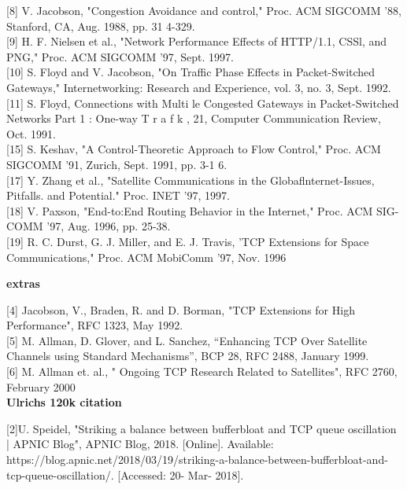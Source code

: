 \documentclass{uathesis}
\begin{document}
[8] V. Jacobson, "Congestion Avoidance and control," Proc. ACM SIGCOMM
'88, Stanford, CA, Aug. 1988, pp. 31 4-329. \\

[9] H. F. Nielsen et al., "Network Performance Effects of HTTP/1.1, CSSl, and
PNG," Proc. ACM SIGCOMM '97, Sept. 1997.\\

[10] S. Floyd and V. Jacobson, "On Traffic Phase Effects in Packet-Switched
Gateways," Internetworking: Research and Experience, vol. 3, no. 3, Sept.
1992.\\

[11] S. Floyd, Connections with Multi le Congested Gateways in Packet-Switched
Networks Part 1 : One-way T r a f k , 21, Computer Communication Review,
Oct. 1991. \\


[15] S. Keshav, "A Control-Theoretic Approach to Flow Control," Proc. ACM
SIGCOMM '91, Zurich, Sept. 1991, pp. 3-1 6. \\


[17] Y. Zhang et al., "Satellite Communications in the Globaflnternet-Issues,
Pitfalls. and Potential." Proc. INET '97, 1997.\\

[18] V. Paxson, "End-to:End Routing Behavior in the Internet," Proc. ACM SIG-
COMM '97, Aug. 1996, pp. 25-38.\\

[19] R. C. Durst, G. J. Miller, and E. J. Travis, 'TCP Extensions for Space Communications," Proc. ACM MobiComm '97, Nov. 1996

\textbf{extras}

[4] Jacobson, V., Braden, R. and D. Borman, "TCP Extensions for High Performance", RFC 1323, May 1992. \\

[5] M. Allman, D. Glover, and L. Sanchez, “Enhancing TCP Over Satellite Channels using Standard Mechanisms”, BCP 28, RFC 2488, January 1999.\\

 [6] M. Allman et. al., " Ongoing TCP Research Related to Satellites", RFC 2760, February 2000\\

\textbf{Ulrichs 120k citation}

[2]U. Speidel, "Striking a balance between bufferbloat and TCP queue oscillation | APNIC Blog", APNIC Blog, 2018. [Online]. Available: https://blog.apnic.net/2018/03/19/striking-a-balance-between-bufferbloat-and-tcp-queue-oscillation/. [Accessed: 20- Mar- 2018].





\printbibliography[heading=bibempty,type=article]
\end{document}
